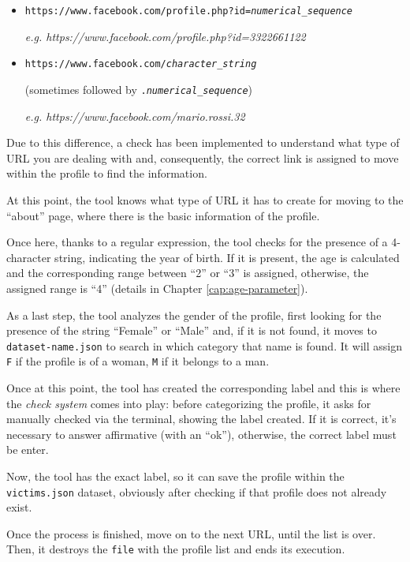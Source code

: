 \begin{itemize}
	\item \texttt{https://www.facebook.com/profile.php?id=\textit{numerical\_sequence}}\par \noindent \textit{e.g. https://www.facebook.com/profile.php?id=3322661122}
	
	\item \texttt{https://www.facebook.com/\textit{character\_string}}\par \noindent (sometimes followed by \texttt{.\textit{numerical\_sequence}})\par \noindent \textit{e.g. https://www.facebook.com/mario.rossi.32}
\end{itemize}
Due to this difference, a check has been implemented to understand what type of URL you are dealing with and, consequently, the correct link is assigned to move within the profile to find the information.
\par \noindent At this point, the tool knows what type of URL it has to create for moving to the ``about'' page, where there is the basic information of the profile. 
\par \noindent Once here, thanks to a regular expression, the tool checks for the presence of a 4-character string, indicating the year of birth. If it is present, the age is calculated and the corresponding range between ``2'' or ``3'' is assigned, otherwise, the assigned range is ``4'' (details in Chapter \ref{cap:age-parameter}).
\par \noindent As a last step, the tool analyzes the gender of the profile, first looking for the presence of the string ``Female'' or ``Male'' and, if it is not found, it moves to \texttt{dataset-name.json} to search in which category that name is found. It will assign \texttt{F} if the profile is of a woman, \texttt{M} if it belongs to a man.
\par \noindent 
Once at this point, the tool has created the corresponding label and this is where the \textit{check system} comes into play: before categorizing the profile, it asks for manually checked via the terminal, showing the label created. If it is correct, it's necessary to answer affirmative (with an ``ok''), otherwise, the correct label must be enter.
\par \noindent Now, the tool has the exact label, so it can save the profile within the \texttt{victims.json} dataset, obviously after checking if that profile does not already exist.
\par \noindent Once the process is finished, move on to the next URL, until the list is over. Then, it destroys the \texttt{file} with the profile list and ends its execution.
